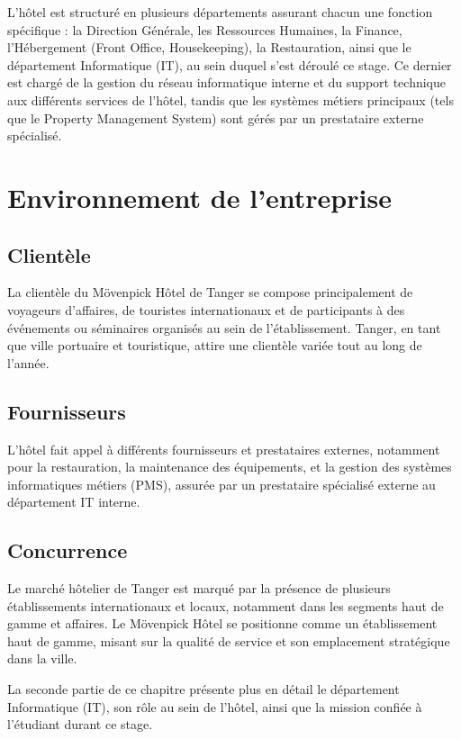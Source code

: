 L'hôtel est structuré en plusieurs départements assurant chacun une fonction
spécifique : la Direction Générale, les Ressources Humaines, la Finance, l'Hébergement
(Front Office, Housekeeping), la Restauration, ainsi que le département Informatique
(IT), au sein duquel s'est déroulé ce stage. Ce dernier est chargé de la gestion du
réseau informatique interne et du support technique aux différents services de l'hôtel,
tandis que les systèmes métiers principaux (tels que le Property Management System)
sont gérés par un prestataire externe spécialisé.

\section{Environnement de l'entreprise}

\subsection{Clientèle}

La clientèle du Mövenpick Hôtel de Tanger se compose principalement de voyageurs
d'affaires, de touristes internationaux et de participants à des événements ou
séminaires organisés au sein de l'établissement. Tanger, en tant que ville portuaire et
touristique, attire une clientèle variée tout au long de l'année.

\subsection{Fournisseurs}

L'hôtel fait appel à différents fournisseurs et prestataires externes, notamment pour la
restauration, la maintenance des équipements, et la gestion des systèmes informatiques
métiers (PMS), assurée par un prestataire spécialisé externe au département IT interne.

\subsection{Concurrence}

Le marché hôtelier de Tanger est marqué par la présence de plusieurs établissements
internationaux et locaux, notamment dans les segments haut de gamme et affaires. Le
Mövenpick Hôtel se positionne comme un établissement haut de gamme, misant sur la
qualité de service et son emplacement stratégique dans la ville.

\bigskip
La seconde partie de ce chapitre présente plus en détail le département Informatique
(IT), son rôle au sein de l'hôtel, ainsi que la mission confiée à l'étudiant durant ce
stage.

